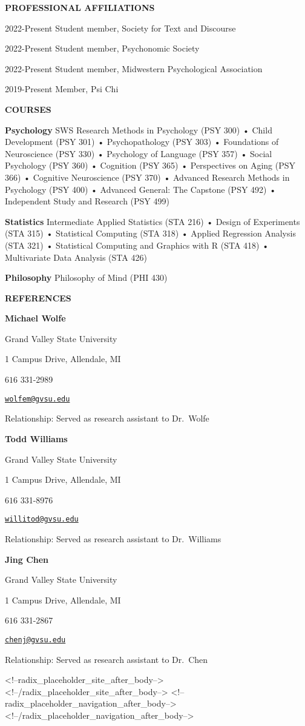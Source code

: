 \documentclass[10pt,a4paper,]{article}
\begin{document}
\textbf{PROFESSIONAL AFFILIATIONS}

2022-Present Student member, Society for Text and Discourse

2022-Present Student member, Psychonomic Society

2022-Present Student member, Midwestern Psychological Association

2019-Present Member, Psi Chi

\textbf{COURSES}

\textbf{Psychology} SWS Research Methods in Psychology (PSY 300) • Child
Development (PSY 301) • Psychopathology (PSY 303) • Foundations of
Neuroscience (PSY 330) • Psychology of Language (PSY 357) • Social
Psychology (PSY 360) • Cognition (PSY 365) • Perspectives on Aging (PSY
366) • Cognitive Neuroscience (PSY 370) • Advanced Research Methods in
Psychology (PSY 400) • Advanced General: The Capstone (PSY 492) •
Independent Study and Research (PSY 499)

\textbf{Statistics} Intermediate Applied Statistics (STA 216) • Design
of Experiments (STA 315) • Statistical Computing (STA 318) • Applied
Regression Analysis (STA 321) • Statistical Computing and Graphics with
R (STA 418) • Multivariate Data Analysis (STA 426)

\textbf{Philosophy} Philosophy of Mind (PHI 430)

\textbf{REFERENCES}

\textbf{Michael Wolfe}

Grand Valley State University

1 Campus Drive, Allendale, MI

\(616\) 331-2989

\href{mailto:wolfem@gvsu.edu}{\nolinkurl{wolfem@gvsu.edu}}

Relationship: Served as research assistant to Dr.~Wolfe

\textbf{Todd Williams}

Grand Valley State University

1 Campus Drive, Allendale, MI

\(616\) 331-8976

\href{mailto:willitod@gvsu.edu}{\nolinkurl{willitod@gvsu.edu}}

Relationship: Served as research assistant to Dr.~Williams

\textbf{Jing Chen}

Grand Valley State University

1 Campus Drive, Allendale, MI

\(616\) 331-2867

\href{mailto:chenj@gvsu.edu}{\nolinkurl{chenj@gvsu.edu}}

Relationship: Served as research assistant to Dr.~Chen

<!--radix_placeholder_site_after_body-->
<!--/radix_placeholder_site_after_body-->
<!--radix_placeholder_navigation_after_body-->
<!--/radix_placeholder_navigation_after_body-->
\end{document}

